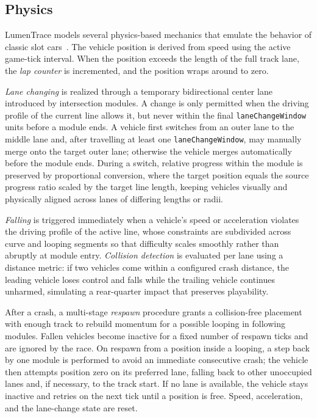 \documentclass[10pt,journal,final,a4paper]{IEEEtran}
\begin{document}
\subsection{Physics}
\label{subsec:physics}

LumenTrace models several physics-based mechanics that emulate the behavior of classic slot cars~\cite{skaar:2025slot}. 
The vehicle position is derived from speed using the active game-tick interval. When the position exceeds the length of the full track lane, the \textit{lap counter} is incremented, and the position wraps around to zero. 

\textit{Lane changing} is realized through a temporary bidirectional center lane introduced by intersection modules. A change is only permitted when the driving profile of the current line allows it, but never within the final \texttt{laneChangeWindow} units before a module ends. A vehicle first switches from an outer lane to the middle lane and, after travelling at least one \texttt{laneChangeWindow}, may manually merge onto the target outer lane; otherwise the vehicle merges automatically before the module ends. During a switch, relative progress within the module is preserved by proportional conversion, where the target position equals the source progress ratio scaled by the target line length, keeping vehicles visually and physically aligned across lanes of differing lengths or radii.

\textit{Falling} is triggered immediately when a vehicle's speed or acceleration violates the driving profile of the active line, whose constraints are subdivided across curve and looping segments so that difficulty scales smoothly rather than abruptly at module entry. \textit{Collision detection} is evaluated per lane using a distance metric: if two vehicles come within a configured crash distance, the leading vehicle loses control and falls while the trailing vehicle continues unharmed, simulating a rear-quarter impact that preserves playability.

After a crash, a multi-stage \textit{respawn} procedure grants a collision-free placement with enough track to rebuild momentum for a possible looping in following modules. Fallen vehicles become inactive for a fixed number of respawn ticks and are ignored by the race. On respawn from a position inside a looping, a step back by one module is performed to avoid an immediate consecutive crash; the vehicle then attempts position zero on its preferred lane, falling back to other unoccupied lanes and, if necessary, to the track start. If no lane is available, the vehicle stays inactive and retries on the next tick until a position is free. Speed, acceleration, and the lane-change state are reset.
\end{document}
